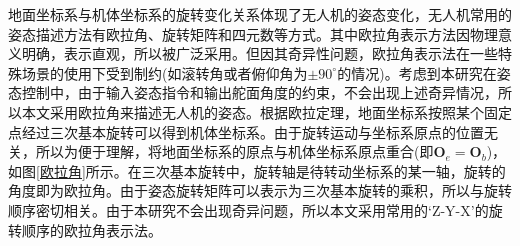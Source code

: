 地面坐标系与机体坐标系的旋转变化关系体现了无人机的姿态变化，无人机常用的姿态描述方法有欧拉角、旋转矩阵和四元数等方式。其中欧拉角表示方法因物理意义明确，表示直观，所以被广泛采用。但因其奇异性问题\cite{全权2018多旋翼飞行器设计与控制}，欧拉角表示法在一些特殊场景的使用下受到制约(如滚转角或者俯仰角为$\pm90^{\circ}$的情况)。考虑到本研究在姿态控制中，由于输入姿态指令和输出舵面角度的约束，不会出现上述奇异情况，所以本文采用欧拉角来描述无人机的姿态。根据欧拉定理，地面坐标系按照某个固定点经过三次基本旋转可以得到机体坐标系。由于旋转运动与坐标系原点的位置无关，所以为便于理解，将地面坐标系的原点与机体坐标系原点重合(即$\boldsymbol{O}_e=\boldsymbol{O}_b$)，如图\ref{欧拉角}所示。在三次基本旋转中，旋转轴是待转动坐标系的某一轴，旋转的角度即为欧拉角。由于姿态旋转矩阵可以表示为三次基本旋转的乘积，所以与旋转顺序密切相关。由于本研究不会出现奇异问题，所以本文采用常用的‘Z-Y-X’的旋转顺序的欧拉角表示法。

